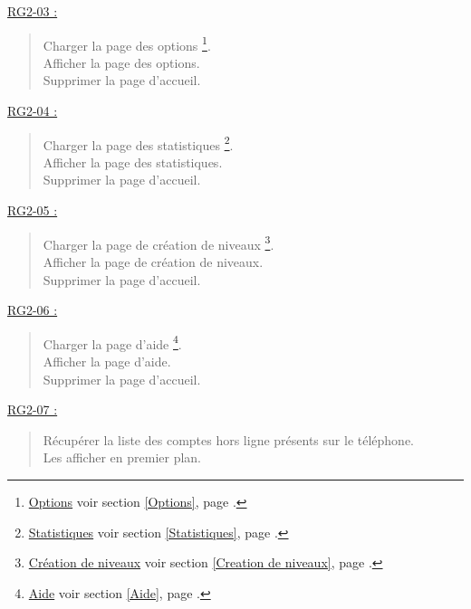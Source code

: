 \documentclass{report}
\begin{document}
		
		\underline{RG2-03 :}
			\begin{quote}
				Charger la page des options%
					\footnote{
						\hyperlink{Options}{Options}
						\og voir section \ref{Options}, page \pageref{Options}.\fg
					}.\\
				Afficher la page des options\footnotemark[5].\\
				Supprimer la page d'accueil\footnotemark[2].\\
			\end{quote}


		\underline{RG2-04 :}
			\begin{quote}
				Charger la page des statistiques%
					\footnote{
						\hyperlink{Statistiques}{Statistiques}
						\og voir section \ref{Statistiques}, page \pageref{Statistiques}.\fg
					}.\\
				Afficher la page des statistiques\footnotemark[6].\\
				Supprimer la page d'accueil\footnotemark[2].\\
			\end{quote}


		\underline{RG2-05 :}
			\begin{quote}
				Charger la page de création de niveaux%
					\footnote{
						\hyperlink{Creation de niveaux}{Création de niveaux}
						\og voir section \ref{Creation de niveaux}, page \pageref{Creation de niveaux}.\fg
					}.\\
				Afficher la page de création de niveaux\footnotemark[7].\\
				Supprimer la page d'accueil\footnotemark[2].\\		
			\end{quote}


		\underline{RG2-06 :}
			\begin{quote}
				Charger la page d'aide%
					\footnote{
						\hyperlink{Aide}{Aide}
						\og voir section \ref{Aide}, page \pageref{Aide}.\fg
					}.\\
				Afficher la page d'aide\footnotemark[8].\\
				Supprimer la page d'accueil\footnotemark[2].\\		
			\end{quote}
			
			
		\underline{RG2-07 :}
			\begin{quote}
				Récupérer la liste des comptes hors ligne présents sur le téléphone.\\
				Les afficher en premier plan.\\
			\end{quote}
\end{document}
